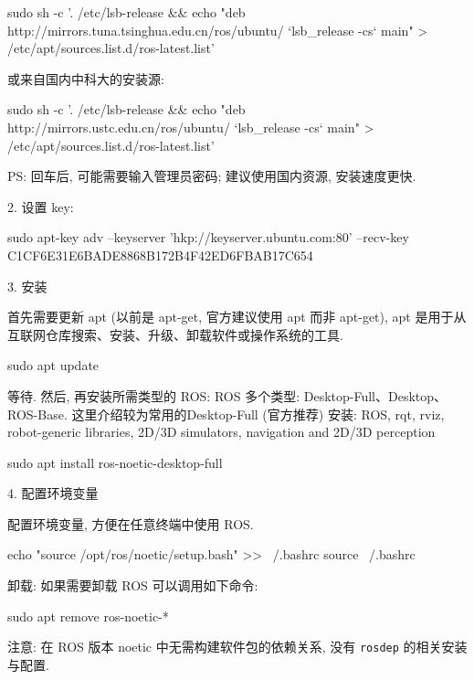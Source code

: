 \documentclass[openany, fontset=windowsold]{ctexbook}
\theoremstyle{kaiti}
\theoremstyle{normal}
\begin{document}
\begin{bash}
  sudo sh -c '. /etc/lsb-release && echo "deb http://mirrors.tuna.tsinghua.edu.cn/ros/ubuntu/ `lsb_release -cs` main" > /etc/apt/sources.list.d/ros-latest.list'
\end{bash}

或来自国内中科大的安装源:

\begin{bash}
  sudo sh -c '. /etc/lsb-release && echo "deb http://mirrors.ustc.edu.cn/ros/ubuntu/ `lsb_release -cs` main" > /etc/apt/sources.list.d/ros-latest.list'
\end{bash}

PS: 回车后, 可能需要输入管理员密码; 建议使用国内资源, 安装速度更快.

2. 设置 key:

\begin{bash}
  sudo apt-key adv --keyserver 'hkp://keyserver.ubuntu.com:80' --recv-key C1CF6E31E6BADE8868B172B4F42ED6FBAB17C654
\end{bash}

3. 安装

首先需要更新 apt (以前是 apt-get, 官方建议使用 apt 而非 apt-get), apt 是用于从互联网仓库搜索、安装、升级、卸载软件或操作系统的工具.

\begin{bash}
  sudo apt update
\end{bash}

等待. 然后, 再安装所需类型的 ROS: ROS 多个类型: Desktop-Full、Desktop、ROS-Base. 这里介绍较为常用的Desktop-Full (官方推荐) 安装: ROS, rqt, rviz, robot-generic libraries, 2D/3D simulators, navigation and 2D/3D perception

\begin{bash}
  sudo apt install ros-noetic-desktop-full
\end{bash}

4. 配置环境变量

配置环境变量, 方便在任意终端中使用 ROS.

\begin{bash}
  echo "source /opt/ros/noetic/setup.bash" >> ~/.bashrc
  source ~/.bashrc
\end{bash}

卸载: 如果需要卸载 ROS 可以调用如下命令:

\begin{bash}
  sudo apt remove ros-noetic-*
\end{bash}

注意: 在 ROS 版本 noetic 中无需构建软件包的依赖关系, 没有 \verb|rosdep| 的相关安装与配置.
\end{document}
